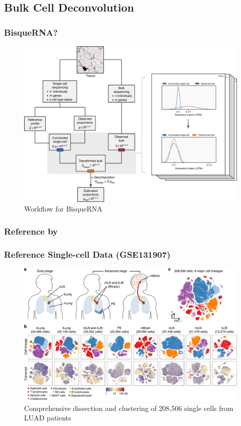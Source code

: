 \documentclass{beamer}
\begin{document}
        \subsection{Bulk Cell Deconvolution}
    \begin{frame}
        \frametitle{BisqueRNA?}

        \begin{figure}
            \includegraphics[width=0.6 \linewidth]{figures/Workflow/Bisque.jpg}
            \caption{Workflow for BisqueRNA \protect\cite{Bisque1}}
        \end{figure}
    \end{frame}

    \subsubsection{Reference by \protect{}}
    \begin{frame}
         \frametitle{Reference Single-cell Data (GSE131907)}

        \begin{figure}
            \includegraphics[width=0.8 \linewidth]{figures/LungCancer/reference_1.jpg}
            \caption{Comprehensive dissection and clustering of 208,506 single cells from LUAD patients \protect\cite{singlecell1}}
        \end{figure}
    \end{frame}
\end{document}
